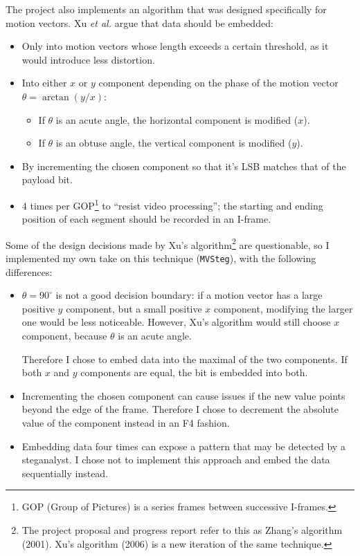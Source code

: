 \documentclass[12pt,british,twoside,notitlepage,usenames,dvipsnames,hypens,final]{report}
\numberwithin{equation}{section}
\numberwithin{figure}{section}
\begin{document}
The project also implements an algorithm that was designed specifically for motion vectors. Xu \emph{et al.} \cite{xu2006steganography} argue that data should be embedded:
\begin{itemize}
\item Only into motion vectors whose length exceeds a certain threshold, as it would introduce less distortion.
\item Into either $x$ or $y$ component depending on the phase of the motion vector $\theta = \arctan(y/x)$:
    \begin{itemize}
    \item If $\theta$ is an acute angle, the horizontal component is modified ($x$).
    \item If $\theta$ is an obtuse angle, the vertical component is modified ($y$).
    \end{itemize}
\item By incrementing the chosen component so that it's LSB matches that of the payload bit.
\item 4 times per GOP\footnote{GOP (Group of Pictures) is a series frames between successive I-frames.} to ``resist video processing''; the starting and ending position of each segment should be recorded in an I-frame.
\end{itemize}

Some of the design decisions made by Xu's algorithm\footnote{The project proposal and progress report refer to this as Zhang's algorithm (2001). Xu's algorithm (2006) is a new iteration of the same technique.} are questionable, so I implemented my own take on this technique (\texttt{MVSteg}), with the following differences:
\begin{itemize}
\item $\theta = 90^{\circ}$ is not a good decision boundary: if a motion vector has a large positive $y$ component, but a small positive $x$ component, modifying the larger one would be less noticeable. However, Xu's algorithm would still choose $x$ component, because $\theta$ is an acute angle. 

Therefore I chose to embed data into the maximal of the two components. If both $x$ and $y$ components are equal, the bit is embedded into both. 

\item Incrementing the chosen component can cause issues if the new value points beyond the edge of the frame. Therefore I chose to decrement the absolute value of the component instead in an F4 fashion.

\item Embedding data four times can expose a pattern that may be detected by a steganalyst. I chose not to implement this approach and embed the data sequentially instead.
\end{itemize}
\end{document}
